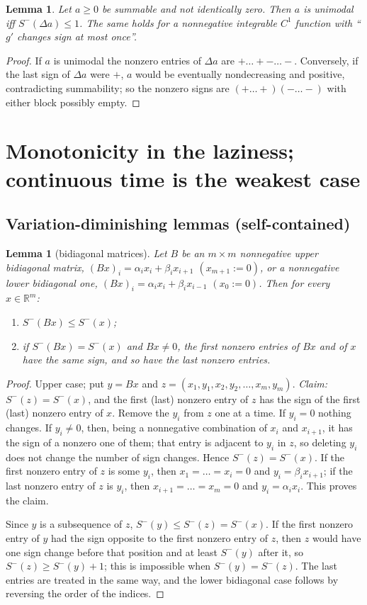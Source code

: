 \documentclass[11pt,a4paper]{article}
\newtheorem{lemma}[theorem]{Lemma}
\theoremstyle{definition}
\newcommand{\Sm}{S^{-}}
\newcommand{\R}{\mathbb R}
\begin{document}
\begin{lemma}\label{lem:unimodal}
Let $a\ge0$ be summable and not identically zero. Then $a$ is unimodal iff $\Sm(\Delta a)\le1$. The same holds for a nonnegative integrable $C^1$ function with ``$g'$ changes sign at most once''.
\end{lemma}
\begin{proof}
If $a$ is unimodal the nonzero entries of $\Delta a$ are $+\dots+-\dots-$. Conversely, if the last sign of $\Delta a$ were $+$, $a$ would be eventually nondecreasing and positive, contradicting summability; so the nonzero signs are $(+\dots+)(-\dots-)$ with either block possibly empty.
\end{proof}

\section{Monotonicity in the laziness; continuous time is the weakest case}\label{sec:thinning}

\subsection{Variation-diminishing lemmas (self-contained)}

\begin{lemma}[bidiagonal matrices]\label{lem:bidiag}
Let $B$ be an $m\times m$ nonnegative upper bidiagonal matrix, $(Bx)_i=\alpha_ix_i+\beta_ix_{i+1}$ $(x_{m+1}:=0)$, or a nonnegative lower bidiagonal one, $(Bx)_i=\alpha_ix_i+\beta_ix_{i-1}$ $(x_0:=0)$. Then for every $x\in\R^m$:
\begin{enumerate}
\item $\Sm(Bx)\le\Sm(x)$;
\item if $\Sm(Bx)=\Sm(x)$ and $Bx\ne0$, the first nonzero entries of $Bx$ and of $x$ have the same sign, and so have the last nonzero entries.
\end{enumerate}
\end{lemma}
\begin{proof}
Upper case; put $y=Bx$ and $z=(x_1,y_1,x_2,y_2,\dots,x_m,y_m)$. \emph{Claim:} $\Sm(z)=\Sm(x)$, and the first (last) nonzero entry of $z$ has the sign of the first (last) nonzero entry of $x$. Remove the $y_i$ from $z$ one at a time. If $y_i=0$ nothing changes. If $y_i\neq0$, then, being a nonnegative combination of $x_i$ and $x_{i+1}$, it has the sign of a nonzero one of them; that entry is adjacent to $y_i$ in $z$, so deleting $y_i$ does not change the number of sign changes. Hence $\Sm(z)=\Sm(x)$. If the first nonzero entry of $z$ is some $y_i$, then $x_1=\dots=x_i=0$ and $y_i=\beta_ix_{i+1}$; if the last nonzero entry of $z$ is $y_i$, then $x_{i+1}=\dots=x_m=0$ and $y_i=\alpha_ix_i$. This proves the claim.

Since $y$ is a subsequence of $z$, $\Sm(y)\le\Sm(z)=\Sm(x)$. If the first nonzero entry of $y$ had the sign opposite to the first nonzero entry of $z$, then $z$ would have one sign change before that position and at least $\Sm(y)$ after it, so $\Sm(z)\ge\Sm(y)+1$; this is impossible when $\Sm(y)=\Sm(z)$. The last entries are treated in the same way, and the lower bidiagonal case follows by reversing the order of the indices.
\end{proof}
\end{document}

